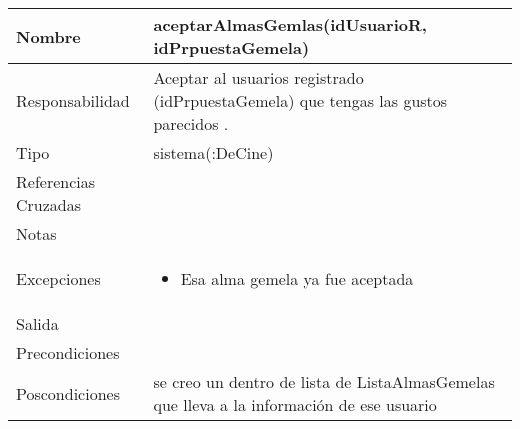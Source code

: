 \documentclass{article}
\begin{document}
\begin{table}[h]
\begin{tabular}{|l|l|l|l|l|l|}
\hline
\multicolumn{2}{|p{3cm}|}{Nombre} & \multicolumn{4}{p{10cm}|}{\textbf{aceptarAlmasGemlas(idUsuarioR, idPrpuestaGemela)}}\\
\hline
\multicolumn{2}{|p{3cm}|}{Responsabilidad} & \multicolumn{4}{p{10cm}|}{Aceptar al usuarios registrado (idPrpuestaGemela) que tengas las gustos parecidos .} \\
\hline
\multicolumn{2}{|p{3cm}|}{Tipo} & \multicolumn{4}{p{10cm}|}{sistema(:DeCine)} \\
\hline
\multicolumn{2}{|p{3cm}|}{Referencias Cruzadas} & \multicolumn{4}{p{10cm}|}{} \\
\hline
\multicolumn{2}{|p{3cm}|}{Notas} & \multicolumn{4}{p{10cm}|}{} \\
\hline
\multicolumn{2}{|p{3cm}|}{Excepciones} & \multicolumn{4}{p{10cm}|}{\begin{itemize}
\item Esa alma gemela ya fue aceptada
\end{itemize}} \\
\hline
\multicolumn{2}{|p{3cm}|}{Salida} & \multicolumn{4}{p{10cm}|}{} \\
\hline
\multicolumn{2}{|p{3cm}|}{Precondiciones} & \multicolumn{4}{p{10cm}|}{} \\
\hline
\multicolumn{2}{|p{3cm}|}{Poscondiciones} & \multicolumn{4}{p{10cm}|}{se creo un  dentro de lista de ListaAlmasGemelas que lleva a la información de ese usuario} \\
\hline
\end{tabular}
\end{table}
\end{document}
